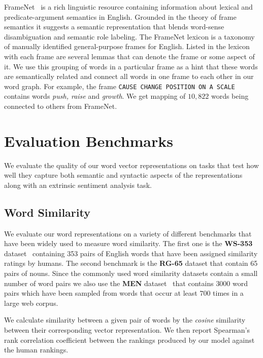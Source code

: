 \documentclass[11pt]{article}
\begin{document}
FrameNet~\cite{fillmore-ua-2003} is a rich linguistic resource containing  information about
lexical and predicate-argument semantics in English. Grounded in the theory of frame semantics it suggests 
a semantic representation that blends word-sense disambiguation and semantic role labeling. The FrameNet lexicon
\cite{Baker:1998:BFP:980845.980860} is a taxonomy of manually identified general-purpose frames for English. 
Listed in the lexicon with each frame are several lemmas that can denote the frame or some aspect of it. 
We use this grouping of words in a particular frame as a hint that these words are semantically related and
connect all words in one frame to each other in our word graph. For example, the frame \texttt{CAUSE CHANGE POSITION ON A SCALE} contains words \textit{push, raise} and \textit{growth}. We get mapping of $10,822$ words being connected to others from FrameNet. 

\section{Evaluation Benchmarks}
\label{sec:eval}

We evaluate the quality of our word vector representations on tasks that
test how well they capture both semantic and syntactic aspects of the representations
along with an extrinsic sentiment analysis task.

\subsection{Word Similarity}
\label{sec:word-sim}

We evaluate our word representations on a variety of different benchmarks that
have been widely used to measure word similarity. The first one is the \textbf{WS-353}
dataset~\cite{citeulike:379845} containing 353 pairs of English words that have been 
assigned similarity ratings by humans. The second benchmark is the \textbf{RG-65} 
\cite{Rubenstein:1965:CCS:365628.365657} dataset that contain 65 pairs of nouns. 
Since the commonly used word similarity datasets contain a small number of word pairs we
also use the \textbf{MEN} dataset~\cite{bruni:2012} that contains $3000$ word 
pairs which have been sampled from words
that occur at least $700$ times in a large web corpus. 

We calculate similarity between a given pair of words by the \textit{cosine}
similarity between their corresponding vector representation.
We then report Spearman's rank correlation coefficient 
\cite{citeulike:8703893} between the rankings produced by our model against the human rankings.
\end{document}
